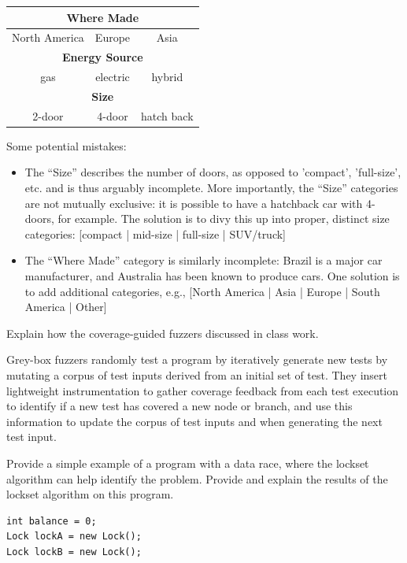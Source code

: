 \documentclass[addpoints, answers]{exam}
\begin{document}
\begin{questions}
  \begin{center}
  \begin{tabular}{|c|c|c|}
    \hline
    \multicolumn{3}{|c|}{\textbf{Where Made}} \\\hline
    North America & Europe & Asia \\\hline
    \multicolumn{3}{|c|}{\textbf{Energy Source}} \\\hline
    gas & electric & hybrid \\\hline
    \multicolumn{3}{|c|}{\textbf{Size}}\\\hline
    2-door & 4-door & hatch back\\\hline
  \end{tabular}
\end{center}
\begin{solution}
  Some potential mistakes:
  \begin{itemize}
  \item The ``Size'' describes the number of doors, as opposed to
    'compact', 'full-size', etc. and is thus arguably incomplete. More
    importantly, the ``Size'' categories are not mutually exclusive:
    it is possible to have a hatchback car with 4-doors, for
    example. The solution is to divy this up into proper, distinct
    size categories: [compact | mid-size | full-size | SUV/truck]
  \item The ``Where Made'' category is similarly incomplete: Brazil is
    a major car manufacturer, and Australia has been known to produce
    cars. One solution is to add additional categories, e.g.,
    [North America | Asia | Europe | South America | Other]
  \end{itemize}
\end{solution}

\newpage

\question[5] Explain how the coverage-guided fuzzers discussed in class work.
\begin{solution} Grey-box fuzzers randomly test a program by
  iteratively generate new tests by mutating a corpus of test inputs
  derived from an initial set of test. They insert lightweight
  instrumentation to gather coverage feedback from each test execution
  to identify if a new test has covered a new node or branch, and use
  this information to update the corpus of test inputs and when
  generating the next test input.
  \end{solution}

  \newpage

\question[4]
  Provide a simple example of a program with a data race, where the
  lockset algorithm can help identify the problem. Provide and explain
  the results of the lockset algorithm on this program. %
  \begin{solution}
    \begin{verbatim}
int balance = 0;
Lock lockA = new Lock();
Lock lockB = new Lock();


\end{verbatim}
\end{solution}
\end{questions}
\end{document}
